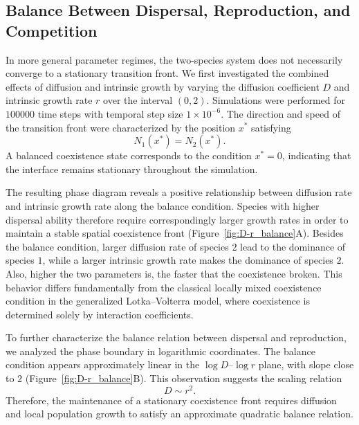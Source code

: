 \subsection{Balance Between Dispersal, Reproduction, and Competition}

In more general parameter regimes, the two-species system does not necessarily converge to a stationary transition front. We first investigated the combined effects of diffusion and intrinsic growth by varying the diffusion coefficient $D$ and intrinsic growth rate $r$ over the interval $(0,2)$. Simulations were performed for $100000$ time steps with temporal step size $1\times10^{-6}$. The direction and speed of the transition front were characterized by the position $x^*$ satisfying
\begin{equation*}
    N_1(x^*) = N_2(x^*).
\end{equation*}
A balanced coexistence state corresponds to the condition $x^*=0$, indicating that the interface remains stationary throughout the simulation.

The resulting phase diagram reveals a positive relationship between diffusion rate and intrinsic growth rate along the balance condition. Species with higher dispersal ability therefore require correspondingly larger growth rates in order to maintain a stable spatial coexistence front (Figure~\ref{fig:D-r_balance}A). Besides the balance condition, larger diffusion rate of species $2$ lead to the dominance of species $1$, while a larger intrinsic growth rate makes the dominance of species $2$. Also, higher the two parameters is, the faster that the coexistence broken. This behavior differs fundamentally from the classical locally mixed coexistence condition in the generalized Lotka--Volterra model, where coexistence is determined solely by interaction coefficients.

To further characterize the balance relation between dispersal and reproduction, we analyzed the phase boundary in logarithmic coordinates. The balance condition appears approximately linear in the $\log D$--$\log r$ plane, with slope close to $2$ (Figure~\ref{fig:D-r_balance}B). This observation suggests the scaling relation
\begin{equation*}
    D \sim r^2.
\end{equation*}
Therefore, the maintenance of a stationary coexistence front requires diffusion and local population growth to satisfy an approximate quadratic balance relation.

\newpage


